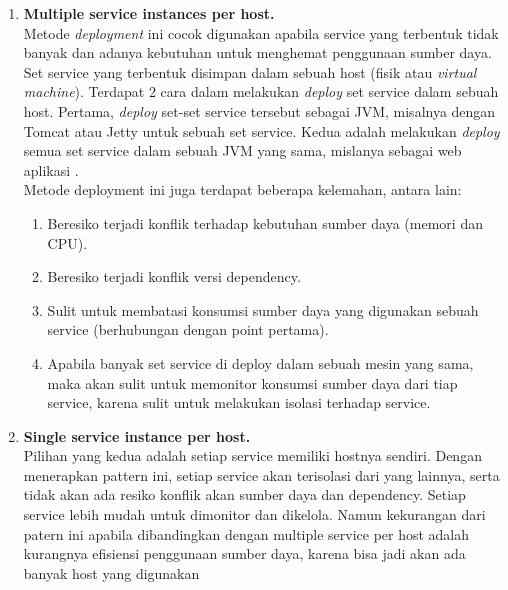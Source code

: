 \begin{enumerate}[leftmargin=*]
	\item \textbf{Multiple service instances per host.}\\
	Metode \textit{deployment} ini cocok digunakan apabila service yang terbentuk tidak banyak dan adanya kebutuhan untuk menghemat penggunaan sumber daya. Set service yang terbentuk disimpan dalam sebuah host (fisik atau \textit{virtual machine}). Terdapat 2 cara dalam melakukan \textit{deploy} set service dalam sebuah host. Pertama, \textit{deploy} set-set service tersebut sebagai JVM, misalnya dengan Tomcat atau Jetty untuk sebuah set service. Kedua adalah melakukan \textit{deploy} semua set service dalam sebuah JVM yang sama, mislanya sebagai web aplikasi \cite{6}.\\
	Metode deployment ini juga terdapat beberapa kelemahan, antara lain:
	\begin{enumerate}[leftmargin=*]
		\item Beresiko terjadi konflik terhadap kebutuhan sumber daya (memori dan CPU).
		\item Beresiko terjadi konflik versi dependency.
		\item Sulit untuk membatasi konsumsi sumber daya yang digunakan sebuah service (berhubungan dengan point pertama).
		\item Apabila banyak set service di deploy dalam sebuah mesin yang sama, maka akan sulit untuk memonitor konsumsi sumber daya dari tiap service, karena sulit untuk melakukan isolasi terhadap service.
	\end{enumerate}
	\item \textbf{Single service instance per host.}\\
	Pilihan yang kedua adalah setiap service memiliki hostnya sendiri. Dengan menerapkan pattern ini, setiap service akan terisolasi dari yang lainnya, serta tidak akan ada resiko konflik akan sumber daya dan dependency. Setiap service lebih mudah untuk dimonitor dan dikelola. Namun kekurangan dari patern ini apabila dibandingkan dengan multiple service per host adalah kurangnya efisiensi penggunaan sumber daya, karena bisa jadi akan ada banyak host yang digunakan \cite{9}
	

\end{enumerate}

